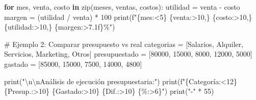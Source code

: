 \documentclass[
  doc,
  floatsintext,
  longtable,
  a4paper,
  nolmodern,
  notxfonts,
  notimes,
  12pt,
  colorlinks=true,linkcolor=blue,citecolor=blue,urlcolor=blue]{apa7}
\newenvironment{Shaded}{\begin{snugshade}}{\end{snugshade}}
\newcommand{\BuiltInTok}[1]{\textcolor[rgb]{0.00,0.23,0.31}{#1}}
\newcommand{\CharTok}[1]{\textcolor[rgb]{0.13,0.47,0.30}{#1}}
\newcommand{\CommentTok}[1]{\textcolor[rgb]{0.37,0.37,0.37}{#1}}
\newcommand{\ControlFlowTok}[1]{\textcolor[rgb]{0.00,0.23,0.31}{\textbf{#1}}}
\newcommand{\DecValTok}[1]{\textcolor[rgb]{0.68,0.00,0.00}{#1}}
\newcommand{\KeywordTok}[1]{\textcolor[rgb]{0.00,0.23,0.31}{\textbf{#1}}}
\newcommand{\NormalTok}[1]{\textcolor[rgb]{0.00,0.23,0.31}{#1}}
\newcommand{\OperatorTok}[1]{\textcolor[rgb]{0.37,0.37,0.37}{#1}}
\newcommand{\SpecialCharTok}[1]{\textcolor[rgb]{0.37,0.37,0.37}{#1}}
\newcommand{\SpecialStringTok}[1]{\textcolor[rgb]{0.13,0.47,0.30}{#1}}
\newcommand{\StringTok}[1]{\textcolor[rgb]{0.13,0.47,0.30}{#1}}
\begin{document}
\begin{Shaded}
\begin{Highlighting}[]
\ControlFlowTok{for}\NormalTok{ mes, venta, costo }\KeywordTok{in} \BuiltInTok{zip}\NormalTok{(meses, ventas, costos):}
\NormalTok{    utilidad }\OperatorTok{=}\NormalTok{ venta }\OperatorTok{{-}}\NormalTok{ costo}
\NormalTok{    margen }\OperatorTok{=}\NormalTok{ (utilidad }\OperatorTok{/}\NormalTok{ venta) }\OperatorTok{*} \DecValTok{100}
    \BuiltInTok{print}\NormalTok{(}\SpecialStringTok{f"}\SpecialCharTok{\{}\NormalTok{mes}\SpecialCharTok{:\textless{}5\}}\SpecialStringTok{ }\SpecialCharTok{\{}\NormalTok{venta}\SpecialCharTok{:\textgreater{}10,\}}\SpecialStringTok{ }\SpecialCharTok{\{}\NormalTok{costo}\SpecialCharTok{:\textgreater{}10,\}}\SpecialStringTok{ }\SpecialCharTok{\{}\NormalTok{utilidad}\SpecialCharTok{:\textgreater{}10,\}}\SpecialStringTok{ }\SpecialCharTok{\{}\NormalTok{margen}\SpecialCharTok{:\textgreater{}7.1f\}}\SpecialStringTok{\%"}\NormalTok{)}

\CommentTok{\# Ejemplo 2: Comparar presupuesto vs real}
\NormalTok{categorias }\OperatorTok{=}\NormalTok{ [}\StringTok{\textquotesingle{}Salarios\textquotesingle{}}\NormalTok{, }\StringTok{\textquotesingle{}Alquiler\textquotesingle{}}\NormalTok{, }\StringTok{\textquotesingle{}Servicios\textquotesingle{}}\NormalTok{, }\StringTok{\textquotesingle{}Marketing\textquotesingle{}}\NormalTok{, }\StringTok{\textquotesingle{}Otros\textquotesingle{}}\NormalTok{]}
\NormalTok{presupuestado }\OperatorTok{=}\NormalTok{ [}\DecValTok{80000}\NormalTok{, }\DecValTok{15000}\NormalTok{, }\DecValTok{8000}\NormalTok{, }\DecValTok{12000}\NormalTok{, }\DecValTok{5000}\NormalTok{]}
\NormalTok{gastado }\OperatorTok{=}\NormalTok{ [}\DecValTok{85000}\NormalTok{, }\DecValTok{15000}\NormalTok{, }\DecValTok{7500}\NormalTok{, }\DecValTok{14000}\NormalTok{, }\DecValTok{4800}\NormalTok{]}

\BuiltInTok{print}\NormalTok{(}\StringTok{"}\CharTok{\textbackslash{}n\textbackslash{}n}\StringTok{Análisis de ejecución presupuestaria:"}\NormalTok{)}
\BuiltInTok{print}\NormalTok{(}\SpecialStringTok{f"}\SpecialCharTok{\{}\StringTok{\textquotesingle{}Categoría\textquotesingle{}}\SpecialCharTok{:\textless{}12\}}\SpecialStringTok{ }\SpecialCharTok{\{}\StringTok{\textquotesingle{}Presup.\textquotesingle{}}\SpecialCharTok{:\textgreater{}10\}}\SpecialStringTok{ }\SpecialCharTok{\{}\StringTok{\textquotesingle{}Gastado\textquotesingle{}}\SpecialCharTok{:\textgreater{}10\}}\SpecialStringTok{ }\SpecialCharTok{\{}\StringTok{\textquotesingle{}Dif.\textquotesingle{}}\SpecialCharTok{:\textgreater{}10\}}\SpecialStringTok{ }\SpecialCharTok{\{}\StringTok{\textquotesingle{}\%\textquotesingle{}}\SpecialCharTok{:\textgreater{}6\}}\SpecialStringTok{"}\NormalTok{)}
\BuiltInTok{print}\NormalTok{(}\StringTok{"{-}"} \OperatorTok{*} \DecValTok{55}\NormalTok{)}


\end{Highlighting}
\end{Shaded}
\end{document}
